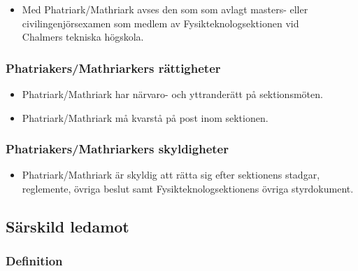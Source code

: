 \documentclass[11pt,a4paper]{article}
\begin{document}
\begin{itemize}

  \item Med Phatriark/Mathriark avses den som som avlagt masters-
  eller civil\-ingenjörs\-examen som medlem av Fysik\-teknolog\-sektionen vid\\
  Ch\-al\-mers tekniska högskola.
 
\end{itemize}

\subsubsection{Phatriakers/Mathriarkers rättigheter}

\begin{itemize}

   \item Phatriark/Mathriark har närvaro- och yttranderätt på sektionsmöten.

   \item Phatriark/Mathriark må kvarstå på post inom sektionen.

\end{itemize}

\subsubsection{Phatriakers/Mathriarkers skyldigheter}

\begin{itemize}


\item Phatriark/Mathriark är skyldig att rätta sig efter sektionens stadgar,
   regle\-mente, övriga beslut samt  Fysikteknologsektionens övriga styrdokument.
\end{itemize}


\newpage


\subsection{Särskild ledamot}

\subsubsection{Definition}
\end{document}
